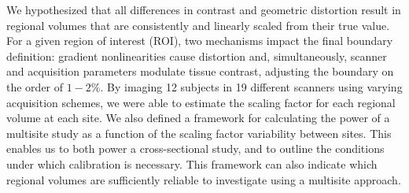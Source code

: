 We hypothesized that all differences in contrast and geometric distortion result in regional volumes that are consistently and linearly scaled from their true value. For a given region of interest (ROI), two mechanisms impact the final boundary definition: gradient nonlinearities cause distortion and, simultaneously, scanner and acquisition parameters modulate tissue contrast, adjusting the boundary on the order of $1-2\%$. By imaging 12 subjects in 19 different scanners using varying acquisition schemes, we were able to estimate the scaling factor for each regional volume at each site. We also defined a framework for calculating the power of a multisite study as a function of the scaling factor variability between sites. This enables us to both power a cross-sectional study, and to outline the conditions under which calibration is necessary. This framework can also indicate which regional volumes are sufficiently reliable to investigate using a multisite approach.